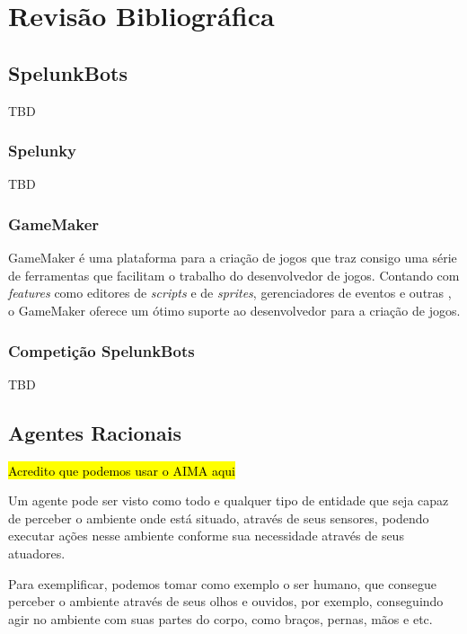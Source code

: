 \chapter{\label{chap:lit-review}Revisão Bibliográfica}

\section{SpelunkBots}

TBD

\subsection{Spelunky}

TBD

\subsection{GameMaker}

GameMaker é uma plataforma para a criação de jogos que traz consigo uma série
de ferramentas que facilitam o trabalho do desenvolvedor de jogos. Contando com
\textit{features} como editores de \textit{scripts} e de \textit{sprites},
gerenciadores de eventos e outras \cite{GMAKER8DOCS}, o GameMaker oferece um
ótimo suporte ao desenvolvedor para a criação de jogos.

\subsection{Competição SpelunkBots}

TBD

\section{Agentes Racionais}

\hl{Acredito que podemos usar o AIMA aqui}

Um agente pode ser visto como todo e qualquer tipo de entidade que seja capaz
de perceber o ambiente onde está situado, através de seus sensores, podendo
executar ações nesse ambiente conforme sua necessidade através de seus atuadores.

Para exemplificar, podemos tomar como exemplo o ser humano, que consegue
perceber o ambiente através de seus olhos e ouvidos, por exemplo, conseguindo
agir no ambiente com suas partes do corpo, como braços, pernas, mãos e etc.

